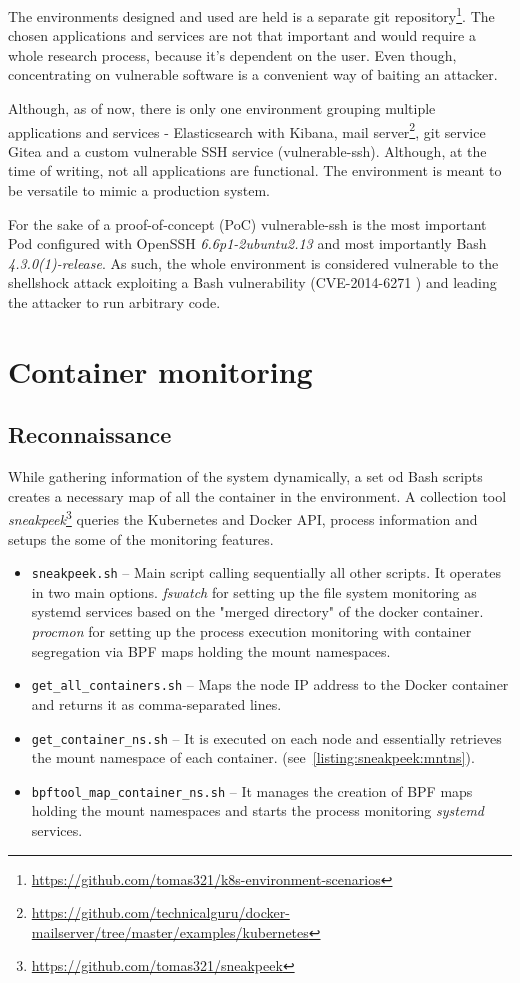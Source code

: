 The environments designed and used are held is a separate git repository\footnote{\url{https://github.com/tomas321/k8s-environment-scenarios}}. The chosen applications and services are not that important and would require a whole research process, because it's dependent on the user. Even though, concentrating on vulnerable software is a convenient way of baiting an attacker.

Although, as of now, there is only one environment grouping multiple applications and services - Elasticsearch with Kibana, mail server\footnote{\url{https://github.com/technicalguru/docker-mailserver/tree/master/examples/kubernetes}}, git service Gitea and a custom vulnerable SSH service (vulnerable-ssh). Although, at the time of writing, not all applications are functional. The environment is meant to be versatile to mimic a production system.

For the sake of a proof-of-concept (PoC) vulnerable-ssh is the most important Pod configured with OpenSSH \textit{6.6p1-2ubuntu2.13} and most importantly Bash \textit{4.3.0(1)-release}. As such, the whole environment is considered vulnerable to the shellshock attack exploiting a Bash vulnerability (CVE-2014-6271 \cite{cve:shellshock}) and leading the attacker to run arbitrary code.

\section{Container monitoring \label{implementation:mon}}


\subsection{Reconnaissance \label{implementation:mon:recon}}
While gathering information of the system dynamically, a set od Bash scripts creates a necessary map of all the container in the environment. A collection tool \textit{sneakpeek}\footnote{\url{https://github.com/tomas321/sneakpeek}} queries the Kubernetes and Docker API, process information and setups the some of the monitoring features.

\begin{itemize}[noitemsep]
	\item \texttt{sneakpeek.sh} -- Main script calling sequentially all other scripts. It operates in two main options. \textit{fswatch} for setting up the file system monitoring as systemd services based on the "merged directory" of the docker container. \textit{procmon} for setting up the process execution monitoring with container segregation via BPF maps holding the mount namespaces.
	\item \texttt{get\_all\_containers.sh} -- Maps the node IP address to the Docker container and returns it as comma-separated lines.
	\item \texttt{get\_container\_ns.sh} -- It is executed on each node and essentially retrieves the mount namespace of each container. (see~\autoref{listing:sneakpeek:mntns}).
	\item \texttt{bpftool\_map\_container\_ns.sh} -- It manages the creation of BPF maps holding the mount namespaces and starts the process monitoring \textit{systemd} services.
\end{itemize}

